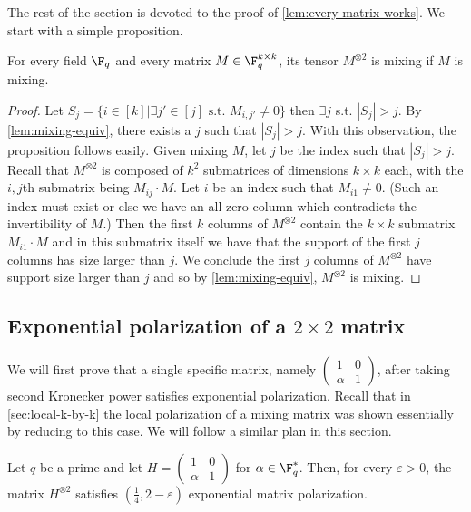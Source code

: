 \documentclass[11pt]{article}
\newcommand{\HadMat}{\left(\begin{smallmatrix} 1 & 0 \\ \alpha & 1 \end{smallmatrix}\right)}
\begin{document}
The rest of the section is devoted to the proof of \cref{lem:every-matrix-works}. 
We start with a simple proposition.

\begin{proposition}\label{prop:m2mixes}
	For every field $\F_q$ and every matrix $M \in \F_q^{k\times k}$, its tensor $M^{\otimes 2}$ is mixing if $M$ is mixing.
\end{proposition}

\begin{proof}
	Let $S_j = \{i \in [k] | \exists j' \in [j] \mbox{ s.t. } M_{i,j'}\ne 0\}$ then $\exists j$ s.t. $|S_j| > j$.
	By \cref{lem:mixing-equiv}, there exists a $j$ such that $|S_j|>j$.
	With this observation, the proposition follows easily. Given mixing $M$, let $j$ be the index such that $|S_j| > j$. Recall that $M^{\otimes 2}$ is composed of $k^2$ submatrices of dimensions $k\times k$ each, with the $i,j$th submatrix being $M_{ij}\cdot M$. Let $i$ be an index such that $M_{i1}\ne 0$. (Such an index must exist or else we have an all zero column which contradicts the invertibility of $M$.) Then the first $k$ columns of $M^{\otimes 2}$ contain the $k\times k$ submatrix $M_{i1}\cdot M$ and in this submatrix itself we have that the support of the first $j$ columns has size larger than $j$. We conclude the first $j$ columns of $M^{\otimes 2}$ have support size larger than $j$ and so by \cref{lem:mixing-equiv}, $M^{\otimes 2}$ is mixing.
\end{proof}

\subsection{Exponential polarization of a $2 \times 2$ matrix}
We will first prove that a single specific matrix, namely $\HadMat$, after taking second Kronecker power satisfies exponential polarization. Recall that in \cref{sec:local-k-by-k} the local polarization of a mixing matrix was shown essentially by reducing to this case. We will follow a similar plan in this section.



\begin{lemma}
	Let $q$ be a prime and let $H = \HadMat$ for $\alpha \in \F_q^*$. Then, for every $\varepsilon > 0$, the matrix $H^{\otimes 2}$ satisfies $(\frac{1}{4}, 2-\varepsilon)$ exponential matrix polarization.
	\label{lem:4-by-4}
\end{lemma}
\end{document}

